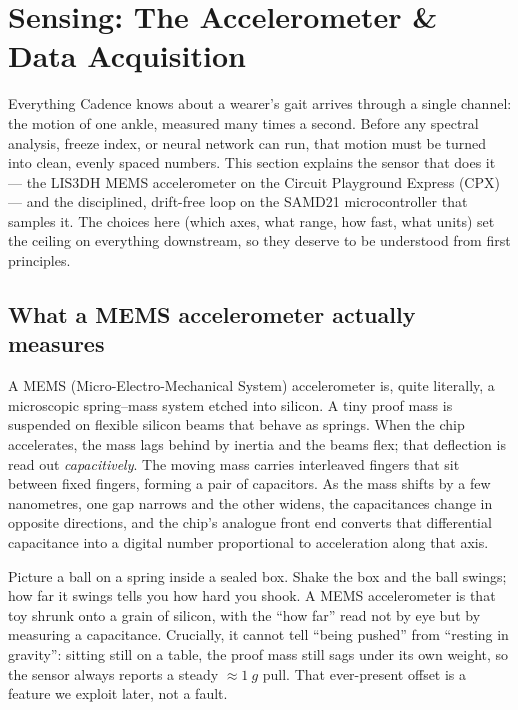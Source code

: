 \section{Sensing: The Accelerometer \& Data Acquisition}
\label{sec:sensing}

Everything Cadence knows about a wearer's gait arrives through a single channel: the
motion of one ankle, measured many times a second. Before any spectral analysis,
freeze index, or neural network can run, that motion must be turned into clean, evenly
spaced numbers. This section explains the sensor that does it --- the LIS3DH MEMS
accelerometer on the Circuit Playground Express (CPX) --- and the disciplined,
drift-free loop on the SAMD21 microcontroller that samples it. The choices here
(which axes, what range, how fast, what units) set the ceiling on everything
downstream, so they deserve to be understood from first principles.

\subsection{What a MEMS accelerometer actually measures}

A MEMS (Micro-Electro-Mechanical System) accelerometer is, quite literally, a
microscopic spring--mass system etched into silicon. A tiny proof mass is suspended
on flexible silicon beams that behave as springs. When the chip accelerates, the mass
lags behind by inertia and the beams flex; that deflection is read out
\emph{capacitively}. The moving mass carries interleaved fingers that sit between
fixed fingers, forming a pair of capacitors. As the mass shifts by a few nanometres,
one gap narrows and the other widens, the capacitances change in opposite directions,
and the chip's analogue front end converts that differential capacitance into a
digital number proportional to acceleration along that axis.

\begin{intuition}
Picture a ball on a spring inside a sealed box. Shake the box and the ball swings;
how far it swings tells you how hard you shook. A MEMS accelerometer is that toy
shrunk onto a grain of silicon, with the ``how far'' read not by eye but by measuring
a capacitance. Crucially, it cannot tell ``being pushed'' from ``resting in
gravity'': sitting still on a table, the proof mass still sags under its own weight,
so the sensor always reports a steady $\approx\SI{1}{g}$ pull. That ever-present
offset is a feature we exploit later, not a fault.
\end{intuition}

